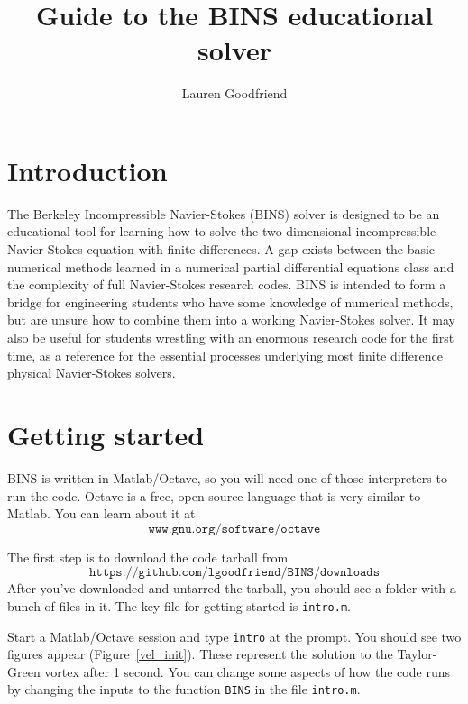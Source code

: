 \documentclass[12pt]{article}
\author{Lauren Goodfriend}
\title{Guide to the BINS educational solver}
\begin{document}
\maketitle
\tableofcontents

\section{Introduction}

The Berkeley Incompressible Navier-Stokes (BINS) solver is designed to be an educational tool for learning how to solve the two-dimensional incompressible Navier-Stokes equation with finite differences.  A gap exists between the basic numerical methods learned in a numerical partial differential equations class and the complexity of full Navier-Stokes research codes.  BINS is intended to form a bridge for engineering students who have some knowledge of numerical methods, but are unsure how to combine them into a working Navier-Stokes solver.  It may also be useful for students wrestling with an enormous research code for the first time, as a reference for the essential processes underlying most finite difference physical Navier-Stokes solvers.

\section{Getting started}

BINS is written in Matlab/Octave, so you will need one of those interpreters to run the code.  Octave is a free, open-source language that is very similar to Matlab.  You can learn about it at \[ \texttt{www.gnu.org/software/octave} \]

The first step is to download the code tarball from \[ \texttt{https://github.com/lgoodfriend/BINS/downloads}\]  After you've downloaded and untarred the tarball, you should see a folder with a bunch of files in it.  The key file for getting started is \texttt{intro.m}.

Start a Matlab/Octave session and type \texttt{intro} at the prompt.  You should see two figures appear (Figure~\ref{vel_init}).  These represent the solution to the Taylor-Green vortex after 1 second.  You can change some aspects of how the code runs by changing the inputs to the function \texttt{BINS} in the file \texttt{intro.m}.
\end{document}
